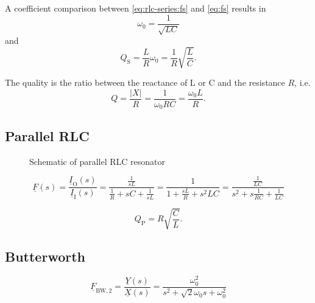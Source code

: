 \documentclass{article}[11pt]
\begin{document}
A coefficient comparison between \eqref{eq:rlc-series:fs} and \eqref{eq:fs}
results in 
\begin{equation}
\omega_0 = \frac{1}{\sqrt{LC}}
\end{equation}
and
\begin{equation}
Q_{\mathrm{S}} = \frac{L}{R} \omega_0 = \frac{1}{R} \sqrt{\frac{L}{C}}.
\end{equation}

The quality is the ratio between the reactance of L or C and the resistance $R$, 
i.e.
\begin{equation}
Q = \frac{\left|X\right|}{R} = \frac{1}{\omega_0 R C} = \frac{\omega_0 L}{R}.
\end{equation}

\subsection{Parallel RLC}

\begin{figure}[H]
  \centering
  \begin{circuitikz}
    
  \end{circuitikz}
  \caption{Schematic of parallel RLC resonator}
  \label{fig:parallel-res}
\end{figure}

\begin{equation}
\underline{F}(s) = \frac{\underline{I}_{\mathrm{O}}(s)}{\underline{I}_{\mathrm{I}}(s)} 
                 = \frac{\frac{1}{sL}}{\frac{1}{R}+sC+\frac{1}{sL}}
                 = \frac{1}{1 + \frac{sL}{R}+s^2LC}
                 = \frac{\frac{1}{LC}}{s^2+s \frac{1}{RC} + \frac{1}{LC}}                 
\end{equation}

\begin{equation}
Q_{\mathrm{P}} = R \sqrt{\frac{C}{L}}.
\end{equation}


\subsection{Butterworth}\label{subsec:examples:butterworth}

\begin{equation}
\underline{F}_{\mathrm{BW,2}} = \frac{\underline{Y}(s)}{\underline{X}(s)} 
                 = \frac{\omega_0^2}{s^2 + \sqrt{2} \omega_0 s + \omega_0^2 }
\end{equation}
\end{document}
